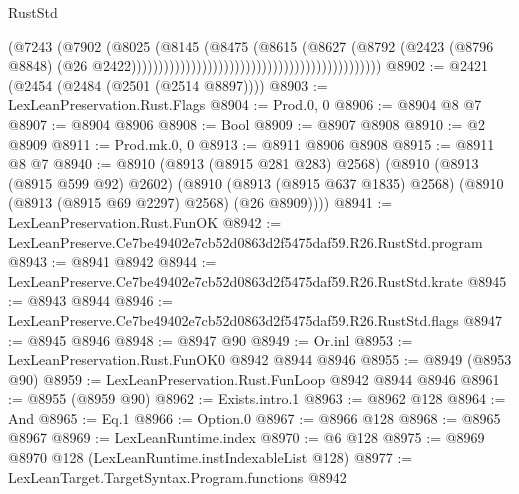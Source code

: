 \begin{lexlean}{RustStd}
\begin{coremodule}
                                                                            (@7243
                                                                              (@7902
                                                                                (@8025
                                                                                  (@8145
                                                                                    (@8475
                                                                                      (@8615
                                                                                        (@8627
                                                                                          (@8792
                                                                                            (@2423
                                                                                              (@8796
                                                                                                @8848)
                                                                                              (@26
                                                                                                @2422))))))))))))))))))))))))))))))))))))))))))))))
@8902 := @2421 (@2454 (@2484 (@2501 (@2514 @8897))))
@8903 := LexLeanPreservation.Rust.Flags
@8904 := Prod.{0, 0}
@8906 := @8904 @8 @7
@8907 := @8904 @8906
@8908 := Bool
@8909 := @8907 @8908
@8910 := @2 @8909
@8911 := Prod.mk.{0, 0}
@8913 := @8911 @8906 @8908
@8915 := @8911 @8 @7
@8940 := @8910
    (@8913 (@8915 @281 @283) @2568)
    (@8910
      (@8913 (@8915 @599 @92) @2602)
      (@8910 (@8913 (@8915 @637 @1835) @2568) (@8910 (@8913 (@8915 @69 @2297) @2568) (@26 @8909))))
@8941 := LexLeanPreservation.Rust.FunOK
@8942 := LexLeanPreserve.Ce7be49402e7cb52d0863d2f5475daf59.R26.RustStd.program
@8943 := @8941 @8942
@8944 := LexLeanPreserve.Ce7be49402e7cb52d0863d2f5475daf59.R26.RustStd.krate
@8945 := @8943 @8944
@8946 := LexLeanPreserve.Ce7be49402e7cb52d0863d2f5475daf59.R26.RustStd.flags
@8947 := @8945 @8946
@8948 := @8947 @90
@8949 := Or.inl
@8953 := LexLeanPreservation.Rust.FunOK0 @8942 @8944 @8946
@8955 := @8949 (@8953 @90)
@8959 := LexLeanPreservation.Rust.FunLoop @8942 @8944 @8946
@8961 := @8955 (@8959 @90)
@8962 := Exists.intro.{1}
@8963 := @8962 @128
@8964 := And
@8965 := Eq.{1}
@8966 := Option.{0}
@8967 := @8966 @128
@8968 := @8965 @8967
@8969 := LexLeanRuntime.index
@8970 := @6 @128
@8975 := @8969 @8970 @128 (LexLeanRuntime.instIndexableList @128)
@8977 := LexLeanTarget.TargetSyntax.Program.functions @8942

\end{coremodule}
\end{lexlean}
